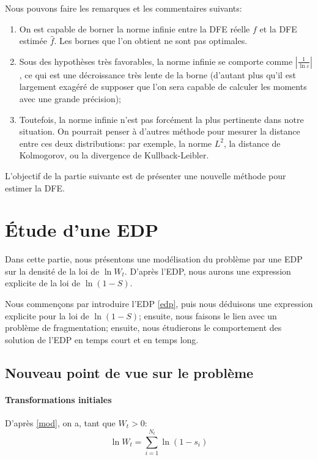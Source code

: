 \documentclass[12pt]{article}
\newcommand{\abs}[1]{\left|#1\right|}
\begin{document}
Nous pouvons faire les remarques et les commentaires suivants:
\begin{enumerate}
\item On est capable de borner la norme infinie entre la DFE réelle $f$ et la DFE estimée $\hat{f}$. Les bornes que l'on obtient ne sont pas optimales.
\item Sous des hypothèses très favorables, la norme infinie se comporte comme $\abs{\frac{1}{\ln\varepsilon}}$, ce qui est une décroissance très lente de la borne (d'autant plus qu'il est largement exagéré de supposer que l'on sera capable de calculer les moments avec une grande précision);
\item Toutefois, la norme infinie n'est pas forcément la plus pertinente dans notre situation. On pourrait penser à d'autres méthode pour mesurer la distance entre ces deux distributions: par exemple, la norme $L^2$, la distance de Kolmogorov, ou la divergence de Kullback-Leibler.
\end{enumerate}

L'objectif de la partie suivante est de présenter une nouvelle méthode pour estimer la DFE.



\section{Étude d'une EDP}

Dans cette partie, nous présentons une modélisation du problème par une EDP sur la densité de la loi de $\ln W_t$. D'après l'EDP, nous aurons une expression explicite de la loi de $\ln (1-S)$.

Nous commençons par introduire l'EDP \eqref{edp}, puis nous déduisons une expression explicite pour la loi de $\ln(1-S)$; ensuite, nous faisons le lien avec un problème de fragmentation; ensuite, nous étudierons le comportement des solution de l'EDP en temps court et en temps long.

\subsection{Nouveau point de vue sur le problème}

\paragraph{Transformations initiales}

D'après \eqref{mod}, on a, tant que $W_t>0$: \[\ln W_t=\sum_{i=1}^{N_t}\ln(1-s_i)\]
\end{document}
